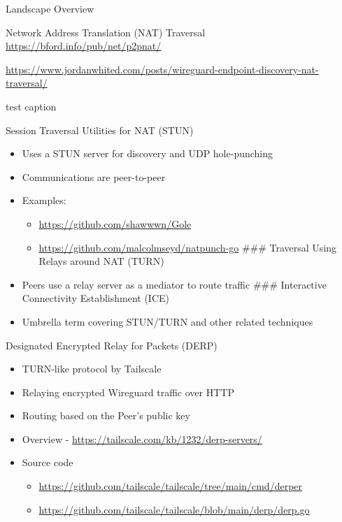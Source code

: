 \begin{frame}[fragile]{Landscape Overview}
\begin{block}{Network Address Translation (NAT) Traversal}
\protect\hypertarget{network-address-translation-nat-traversal}{}
\url{https://bford.info/pub/net/p2pnat/}

\url{https://www.jordanwhited.com/posts/wireguard-endpoint-discovery-nat-traversal/}

\begin{block}{test caption}
\protect\hypertarget{test}{}
\end{block}

\begin{block}{Session Traversal Utilities for NAT (STUN)}
\protect\hypertarget{session-traversal-utilities-for-nat-stun}{}
\begin{itemize}
\tightlist
\item
  Uses a STUN server for discovery and UDP hole-punching
\item
  Communications are peer-to-peer
\item
  Examples:

  \begin{itemize}
  \tightlist
  \item
    \url{https://github.com/shawwwn/Gole}
  \item
    \url{https://github.com/malcolmseyd/natpunch-go} \#\#\# Traversal
    Using Relays around NAT (TURN)
  \end{itemize}
\item
  Peers use a relay server as a mediator to route traffic \#\#\#
  Interactive Connectivity Establishment (ICE)
\item
  Umbrella term covering STUN/TURN and other related techniques
\end{itemize}
\end{block}

\begin{block}{Designated Encrypted Relay for Packets (DERP)}
\protect\hypertarget{designated-encrypted-relay-for-packets-derp}{}
\begin{itemize}
\tightlist
\item
  TURN-like protocol by Tailscale
\item
  Relaying encrypted Wireguard traffic over HTTP
\item
  Routing based on the Peer's public key
\item
  Overview - \url{https://tailscale.com/kb/1232/derp-servers/}
\item
  Source code

  \begin{itemize}
  \tightlist
  \item
    \url{https://github.com/tailscale/tailscale/tree/main/cmd/derper}
  \item
    \url{https://github.com/tailscale/tailscale/blob/main/derp/derp.go}
  \end{itemize}
\end{itemize}
\end{block}
\end{block}


\end{frame}
